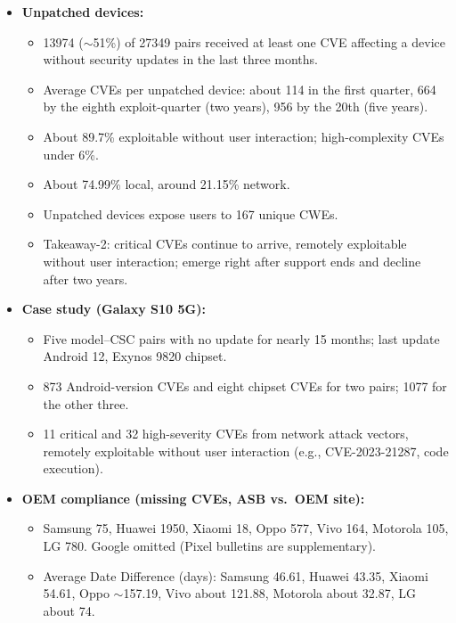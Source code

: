 \documentclass[11pt,a4paper]{article}
\begin{document}
\begin{enumerate}
\begin{itemize}[leftmargin=*,itemsep=1pt,topsep=2pt]
\begin{itemize}[itemsep=0pt]
            \item Knox (Samsung): 218 Knox, 33 Android Others, four Android Go devices. Android Go gets 96 days of biannual support on average, Knox 291 days.
        \end{itemize}
        \item \textbf{Unpatched devices:}
        \begin{itemize}[itemsep=0pt]
            \item 13974 ($\sim$51\%) of 27349 pairs received at least one CVE affecting a device without security updates in the last three months.
            \item Average CVEs per unpatched device: about 114 in the first quarter, 664 by the eighth exploit-quarter (two years), 956 by the 20th (five years).
            \item About 89.7\% exploitable without user interaction; high-complexity CVEs under 6\%.
            \item About 74.99\% local, around 21.15\% network.
            \item Unpatched devices expose users to 167 unique CWEs.
            \item Takeaway-2: critical CVEs continue to arrive, remotely exploitable without user interaction; emerge right after support ends and decline after two years.
        \end{itemize}
        \item \textbf{Case study (Galaxy S10 5G):}
        \begin{itemize}[itemsep=0pt]
            \item Five model--CSC pairs with no update for nearly 15 months; last update Android 12, Exynos 9820 chipset.
            \item 873 Android-version CVEs and eight chipset CVEs for two pairs; 1077 for the other three.
            \item 11 critical and 32 high-severity CVEs from network attack vectors, remotely exploitable without user interaction (e.g., CVE-2023-21287, code execution).
        \end{itemize}
        \item \textbf{OEM compliance (missing CVEs, ASB vs.\ OEM site):}
        \begin{itemize}[itemsep=0pt]
            \item Samsung 75, Huawei 1950, Xiaomi 18, Oppo 577, Vivo 164, Motorola 105, LG 780. Google omitted (Pixel bulletins are supplementary).
            \item Average Date Difference (days): Samsung 46.61, Huawei 43.35, Xiaomi 54.61, Oppo $\sim$157.19, Vivo about 121.88, Motorola about 32.87, LG about 74.

\end{itemize}
\end{itemize}
\end{enumerate}
\end{document}
